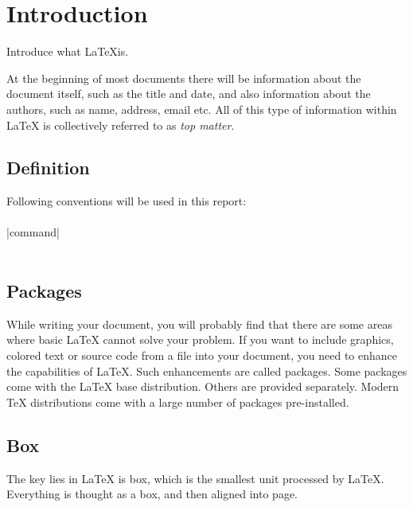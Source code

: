 \chapter{Introduction}
Introduce what \LaTeX is.

At the beginning of most documents there will be information about the
document itself, such as the title and date, and also information about the
authors, such as name, address, email etc. All of this type of information
within LaTeX is collectively referred to as \textit{top matter}. 

\section{Definition}
Following conventions will be used in this report:  \\
   \\
\command|command|   \\
	    \\

\section{Packages}
While writing your document, you will probably find that there are some
areas where basic LaTeX cannot solve your problem. If you want to include
graphics, colored text or source code from a file into your document, you
need to enhance the capabilities of LaTeX. Such enhancements are called
packages. Some packages come with the LaTeX base distribution. Others are
provided separately. Modern TeX distributions come with a large number of
packages pre-installed. 

\section{Box}
The key lies in \LaTeX{} is box, which is the smallest unit processed by
\LaTeX{}. Everything is thought as a box, and then aligned into page.

